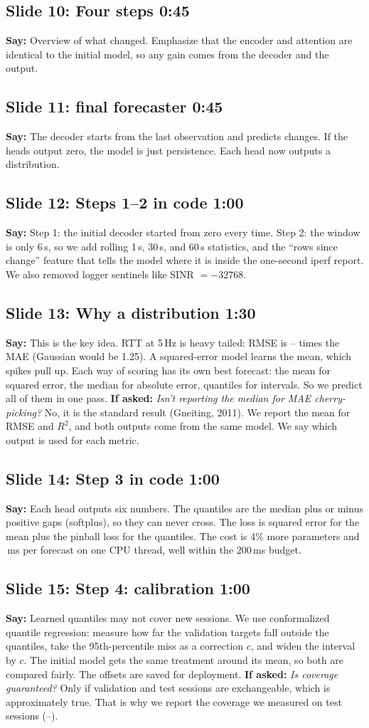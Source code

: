 \documentclass[11pt]{article}
\newcommand{\slide}[3]{\subsection*{Slide #1: #2 \hfill{\normalsize\color{gray}#3}}}
\newcommand{\say}{\textbf{Say:} }
\newcommand{\watch}{\textbf{If asked:} }
\begin{document}
\slide{10}{Four steps}{0:45}
\say Overview of what changed. Emphasize that the encoder and attention are identical to the initial model, so any gain comes from the decoder and the output.

\slide{11}{final forecaster}{0:45}
\say The decoder starts from the last observation and predicts changes. If the heads output zero, the model is just persistence. Each head now outputs a distribution.

\slide{12}{Steps 1--2 in code}{1:00}
\say Step 1: the initial decoder started from zero every time. Step 2: the window is only 6\,s, so we add rolling 1\,s, 30\,s, and 60\,s statistics, and the ``rows since change'' feature that tells the model where it is inside the one-second iperf report. We also removed logger sentinels like SINR $=-32768$.

\slide{13}{Why a distribution}{1:30}
\say This is the key idea. RTT at 5\,Hz is heavy tailed: RMSE is \RatioRMSEMAEMin--\RatioRMSEMAEMax{} times the MAE (Gaussian would be 1.25). A squared-error model learns the mean, which spikes pull up. Each way of scoring has its own best forecast: the mean for squared error, the median for absolute error, quantiles for intervals. So we predict all of them in one pass.
\watch \emph{Isn't reporting the median for MAE cherry-picking?} No, it is the standard result (Gneiting, 2011). We report the mean for RMSE and $R^2$, and both outputs come from the same model. We say which output is used for each metric.

\slide{14}{Step 3 in code}{1:00}
\say Each head outputs six numbers. The quantiles are the median plus or minus positive gaps (softplus), so they can never cross. The loss is squared error for the mean plus the pinball loss for the quantiles. The cost is 4\% more parameters and \TimeDSCPU\,ms per forecast on one CPU thread, well within the 200\,ms budget.

\slide{15}{Step 4: calibration}{1:00}
\say Learned quantiles may not cover new sessions. We use conformalized quantile regression: measure how far the validation targets fall outside the quantiles, take the 95th-percentile miss as a correction $c$, and widen the interval by $c$. The initial model gets the same treatment around its mean, so both are compared fairly. The offsets are saved for deployment.
\watch \emph{Is coverage guaranteed?} Only if validation and test sessions are exchangeable, which is approximately true. That is why we report the coverage we measured on test sessions (\PICPMin--\PICPMax).
\end{document}
